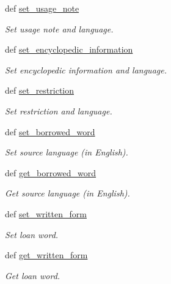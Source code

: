 \begin{DoxyCompactItemize}
def \hyperlink{classlmf_1_1src_1_1core_1_1lexical__entry_1_1_lexical_entry_aaf37b80eaa95fb2fc6e8a20e5cf3e023}{set\+\_\+usage\+\_\+note}
\begin{DoxyCompactList}\small\item\em Set usage note and language. \end{DoxyCompactList}\item 
def \hyperlink{classlmf_1_1src_1_1core_1_1lexical__entry_1_1_lexical_entry_af08e4e9e77021330f1a093e7e0fe7a36}{set\+\_\+encyclopedic\+\_\+information}
\begin{DoxyCompactList}\small\item\em Set encyclopedic information and language. \end{DoxyCompactList}\item 
def \hyperlink{classlmf_1_1src_1_1core_1_1lexical__entry_1_1_lexical_entry_a39a8812156d3d5710691ca427cd7fd6f}{set\+\_\+restriction}
\begin{DoxyCompactList}\small\item\em Set restriction and language. \end{DoxyCompactList}\item 
def \hyperlink{classlmf_1_1src_1_1core_1_1lexical__entry_1_1_lexical_entry_a1530ee0141c9459719b0e07b65ccff82}{set\+\_\+borrowed\+\_\+word}
\begin{DoxyCompactList}\small\item\em Set source language (in English). \end{DoxyCompactList}\item 
def \hyperlink{classlmf_1_1src_1_1core_1_1lexical__entry_1_1_lexical_entry_a0cc51d09a44392de1065c5a94e1da39d}{get\+\_\+borrowed\+\_\+word}
\begin{DoxyCompactList}\small\item\em Get source language (in English). \end{DoxyCompactList}\item 
def \hyperlink{classlmf_1_1src_1_1core_1_1lexical__entry_1_1_lexical_entry_a14705c1acad6100ea1adbbe6b89e0f22}{set\+\_\+written\+\_\+form}
\begin{DoxyCompactList}\small\item\em Set loan word. \end{DoxyCompactList}\item 
def \hyperlink{classlmf_1_1src_1_1core_1_1lexical__entry_1_1_lexical_entry_a68a87b24b174bccf92e6a400b6208de4}{get\+\_\+written\+\_\+form}
\begin{DoxyCompactList}\small\item\em Get loan word. \end{DoxyCompactList}\item 

\end{DoxyCompactItemize}

